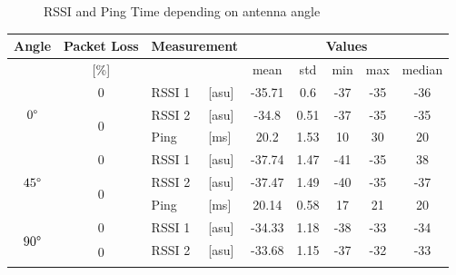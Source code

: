 \begin{figure}[H]
\begin{subfigure}{0.45\textwidth}
    \end{subfigure}
    \vspace{\ftspace}
    \caption{RSSI and Ping Time depending on antenna angle}
    \label{fig:antennaangle}
\end{figure}

\begin{table}[H]
    \centering
    \begin{tabular}{|c|c|l|l|c|c|c|c|c|}
    \hline
        Angle & Packet Loss & \multicolumn{2}{l|}{Measurement} & \multicolumn{5}{c|}{Values} \\\hline
        [\degree] & [\%] & \multicolumn{2}{l|}{} & mean & std & min & max & median \\\hline\hline
        \multirow{3}{*}{$0\degree$} & \multirow{1}{*}{0} & RSSI 1 & [asu] & -35.71 & 0.6 & -37 & -35 & -36 \\\cline{2-9}\cline{2-9}
        & \multirow{2}{*}{0} & RSSI 2 & [asu] & -34.8 & 0.51 & -37 & -35 & -35 \\\cline{3-9}
        && Ping & [ms] & 20.2 & 1.53 & 10 & 30 & 20 \\\hline\hline
        \multirow{3}{*}{$45\degree$} & \multirow{1}{*}{0} & RSSI 1 & [asu] & -37.74 & 1.47 & -41 & -35 & 38 \\\cline{2-9}\cline{2-9}
        & \multirow{2}{*}{0} & RSSI 2 & [asu] & -37.47 &1.49 & -40 & -35 & -37 \\\cline{3-9}
        && Ping & [ms] & 20.14 & 0.58 & 17 & 21 & 20 \\\hline\hline
        \multirow{3}{*}{$90\degree$} & \multirow{1}{*}{0} & RSSI 1 & [asu] & -34.33 & 1.18 & -38 & -33 & -34 \\\cline{2-9}\cline{2-9}
        & \multirow{2}{*}{0} & RSSI 2 & [asu] & -33.68 & 1.15 & -37 & -32 & -33 \\\cline{3-9}

\end{tabular}
\end{table}

